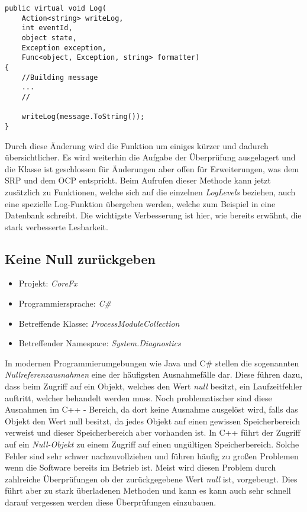 \begin{lstlisting}[language={[Sharp]C}, caption=Beispiele für Switch Statement, label=lst:WithoutSwitch]
public virtual void Log(
	Action<string> writeLog,
	int eventId,
	object state,
	Exception exception,
	Func<object, Exception, string> formatter)
{
	//Building message
	...
	//

	writeLog(message.ToString());
}
\end{lstlisting}

\SuperPar Durch diese Änderung wird die Funktion um einiges kürzer und dadurch übersichtlicher. Es wird weiterhin die Aufgabe der Überprüfung ausgelagert und die Klasse ist geschlossen für Änderungen aber offen für Erweiterungen, was dem SRP und dem OCP entspricht. Beim Aufrufen dieser Methode kann jetzt zusätzlich zu Funktionen, welche sich auf die einzelnen \textit{LogLevels} beziehen, auch eine spezielle Log-Funktion übergeben werden, welche zum Beispiel in eine Datenbank schreibt. Die wichtigste Verbesserung ist hier, wie bereits erwähnt, die stark verbesserte Lesbarkeit.

\subsection{Keine Null zurückgeben}
\begin{itemize}
	\item Projekt: \textit{CoreFx}
	\item Programmiersprache: \textit{C\#}
	\item Betreffende Klasse: \textit{ProcessModuleCollection}
	\item Betreffender Namespace: \textit{System.Diagnostics}
\end{itemize}

\SuperPar In modernen Programmierumgebungen wie Java und C\# stellen die sogenannten \textit{Nullreferenzausnahmen} eine der häufigsten Ausnahmefälle dar. Diese führen dazu, dass beim Zugriff auf ein Objekt, welches den Wert \textit{null} besitzt, ein Laufzeitfehler auftritt, welcher behandelt werden muss. Noch problematischer sind diese Ausnahmen im C++ - Bereich, da dort keine Ausnahme ausgelöst wird, falls das Objekt den Wert null besitzt, da jedes Objekt auf einen gewissen Speicherbereich verweist und dieser Speicherbereich aber vorhanden ist. In C++ führt der Zugriff auf ein \textit{Null-Objekt} zu einem Zugriff auf einen ungültigen Speicherbereich. Solche Fehler sind sehr schwer nachzuvollziehen und führen häufig zu großen Problemen wenn die Software bereits im Betrieb ist. Meist wird diesen Problem durch zahlreiche Überprüfungen ob der zurückgegebene Wert \textit{null} ist, vorgebeugt. Dies führt aber zu stark überladenen Methoden und kann es kann auch sehr schnell darauf vergessen werden diese Überprüfungen einzubauen.


